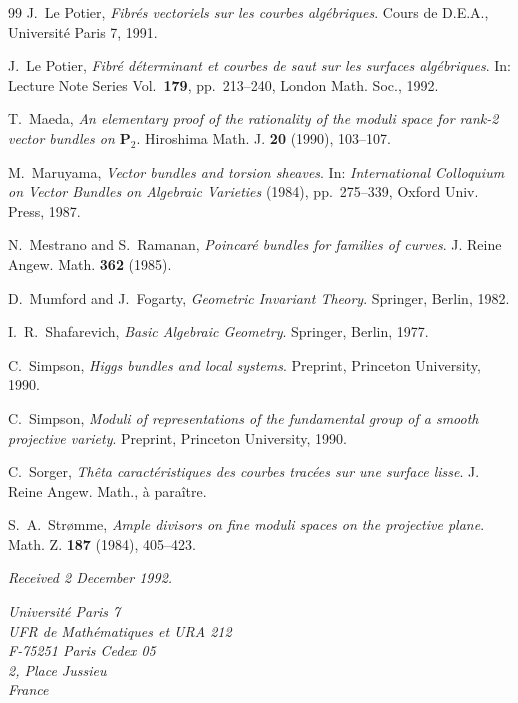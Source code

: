 \documentclass[12pt,english]{smfart}%
\theoremstyle{plain}
\theoremstyle{definition}
\theoremstyle{remark}
\newcommand{\PP}{\mathbf{P}}
\begin{document}
\begin{thebibliography}{99}
 J.~Le Potier, \emph{Fibr\'es vectoriels sur les courbes alg\'ebriques}. Cours de D.E.A., Universit\'e Paris 7, 1991.

 J.~Le Potier, \emph{Fibr\'e d\'eterminant et courbes de saut sur les surfaces alg\'ebriques}. In: Lecture Note Series Vol.~\textbf{179}, pp.~213--240, London Math. Soc., 1992.

 T.~Maeda, \emph{An elementary proof of the rationality of the moduli space for rank-2 vector bundles on $\PP_{2}$}. Hiroshima Math. J. \textbf{20} (1990), 103--107.

 M.~Maruyama, \emph{Vector bundles and torsion sheaves}. In: \emph{International Colloquium on Vector Bundles on Algebraic Varieties} (1984), pp.~275--339, Oxford Univ. Press, 1987.

 N.~Mestrano and S.~Ramanan, \emph{Poincar\'e bundles for families of curves}. J. Reine Angew. Math. \textbf{362} (1985).

 D.~Mumford and J.~Fogarty, \emph{Geometric Invariant Theory}. Springer, Berlin, 1982.

 I.~R.~Shafarevich, \emph{Basic Algebraic Geometry}. Springer, Berlin, 1977.

 C.~Simpson, \emph{Higgs bundles and local systems}. Preprint, Princeton University, 1990.

 C.~Simpson, \emph{Moduli of representations of the fundamental group of a smooth projective variety}. Preprint, Princeton University, 1990.

 C.~Sorger, \emph{Th\^eta caract\'eristiques des courbes trac\'ees sur une surface lisse}. J. Reine Angew. Math., \`a para\^itre.

 S.~A.~Str\o mme, \emph{Ample divisors on fine moduli spaces on the projective plane}. Math. Z. \textbf{187} (1984), 405--423.

\end{thebibliography}

\vspace{1em}
\noindent\emph{Received 2 December 1992.}

\begin{flushright}
\itshape
Universit\'e Paris 7\\
UFR de Math\'ematiques et URA 212\\
F-75251 Paris Cedex 05\\
2, Place Jussieu\\
France
\end{flushright}
\end{document}
